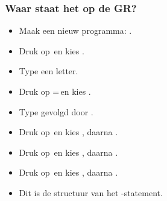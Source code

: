 \begin{frame}

\end{frame}






\begin{frame}
\frametitle{Waar staat het op de GR?}


\begin{itemize}
  \item<1-> Maak een nieuw programma: .
  \item<2-> Druk op \tiPRGM\,en kies .
  \item<3-> Type een letter.
  \item<4-> Druk op \tiTEST=\tiSecond\tiMATH\,en kies \tifonttxt{=}.
  \item<5-> Type  gevolgd door \tiENTER.
  \item<6-> Druk op \tiPRGM\,en kies , daarna \tiENTER.
  \item<7-> Druk op \tiPRGM\,en kies , daarna \tiENTER.
  \item<8-> Druk op \tiPRGM\,en kies , daarna \tiENTER.
  \item<9-> Dit is de structuur van het -statement.
\end{itemize}



\end{frame}
